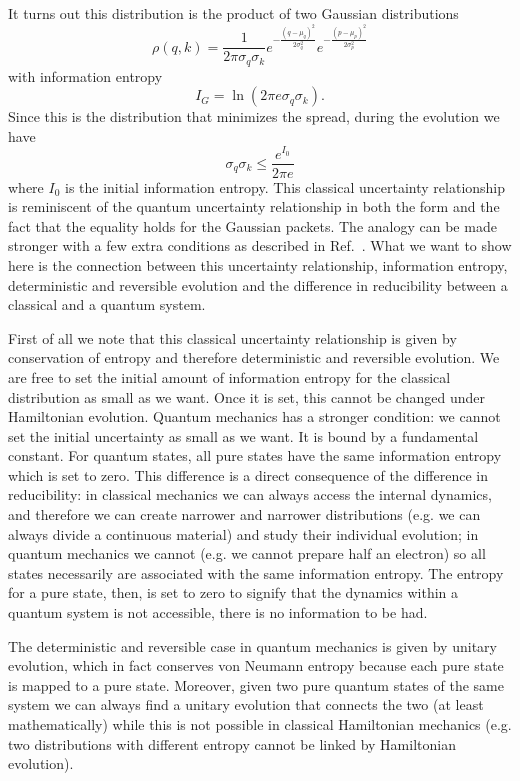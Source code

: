 \documentclass{article}
\begin{document}
It turns out this distribution is the product of two Gaussian distributions
\begin{equation}
\rho(q,k) = \frac{1}{2\pi\sigma_q\sigma_k} e^{- \frac{(q - \mu_q)^2}{2 \sigma_q^2}} e^{- \frac{(p - \mu_p)^2}{2 \sigma_p^2}}
\end{equation}
with information entropy
\begin{equation}
I_G = \ln (2 \pi e \sigma_q \sigma_k).
\end{equation}
Since this is the distribution that minimizes the spread, during the evolution we have
\begin{equation}
\sigma_q \sigma_k \leq \frac{e^{I_0}}{2 \pi e}
\end{equation}
where $I_0$ is the initial information entropy. This classical uncertainty relationship is reminiscent of the quantum uncertainty relationship in both the form and the fact that the equality holds for the Gaussian packets. The analogy can be made stronger with a few extra conditions as described in Ref.~\cite{Carc1}. What we want to show here is the connection between this uncertainty relationship, information entropy, deterministic and reversible evolution and the difference in reducibility between a classical and a quantum system.

First of all we note that this classical uncertainty relationship is given by conservation of entropy and therefore deterministic and reversible evolution. We are free to set the initial amount of information entropy for the classical distribution as small as we want. Once it is set, this cannot be changed under Hamiltonian evolution. Quantum mechanics has a stronger condition: we cannot set the initial uncertainty as small as we want. It is bound by a fundamental constant. For quantum states, all pure states have the same information entropy which is set to zero. This difference is a direct consequence of the difference in reducibility: in classical mechanics we can always access the internal dynamics, and therefore we can create narrower and narrower distributions (e.g. we can always divide a continuous material) and study their individual evolution; in quantum mechanics we cannot (e.g. we cannot prepare half an electron) so all states necessarily are associated with the same information entropy. The entropy for a pure state, then, is set to zero to signify that the dynamics within a quantum system is not accessible, there is no information to be had.

The deterministic and reversible case in quantum mechanics is given by unitary evolution, which in fact conserves von Neumann entropy because each pure state is mapped to a pure state. Moreover, given two pure quantum states of the same system we can always find a unitary evolution that connects the two (at least mathematically) while this is not possible in classical Hamiltonian mechanics (e.g. two distributions with different entropy cannot be linked by Hamiltonian evolution).
\end{document}
